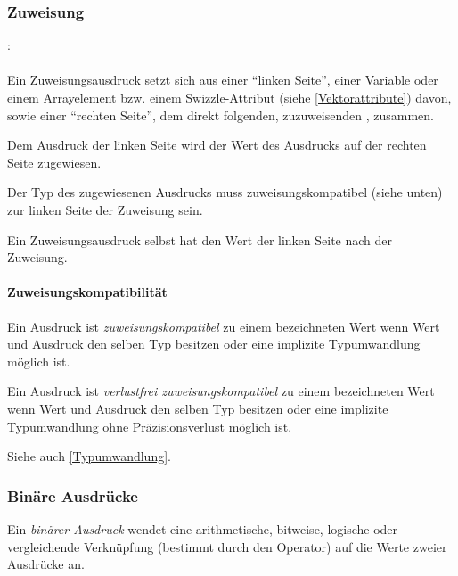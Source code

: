 \subsubsection{Zuweisung}\label{Zuweisung}
:\label{asdr_zuweisung}\\
\hspace*{1cm}\Gspace{}\Gspace\Gt{=}\Gspace{} \\

Ein Zuweisungsausdruck setzt sich aus einer "`linken Seite"', einer Variable oder einem Arrayelement
bzw. einem Swizzle-Attribut (siehe \ref{Vektorattribute}) davon, sowie
einer "`rechten Seite"', dem direkt folgenden, zuzuweisenden , zusammen.

Dem Ausdruck der linken Seite wird der Wert des Ausdrucks
auf der rechten Seite zugewiesen.

Der Typ des zugewiesenen Ausdrucks muss zuweisungskompatibel (siehe unten) zur linken Seite der Zuweisung sein.

Ein Zuweisungsausdruck selbst hat den Wert der linken Seite nach der Zuweisung.

\paragraph{Zuweisungskompatibilität}\label{Zuweisungskompatibilitaet}

Ein Ausdruck ist \emph{zuweisungskompatibel} zu einem bezeichneten Wert wenn
Wert und Ausdruck den selben Typ besitzen oder eine implizite Typumwandlung
möglich ist.

Ein Ausdruck ist \emph{verlustfrei zuweisungskompatibel} zu einem bezeichneten Wert
wenn Wert und Ausdruck den selben Typ besitzen oder eine implizite Typumwandlung
ohne Präzisionsverlust möglich ist.

Siehe auch \ref{Typumwandlung}.


\subsubsection{Binäre Ausdrücke}\label{Binaere Ausdruecke}

Ein \emph{binärer Ausdruck} wendet eine arithmetische, bitweise, logische oder vergleichende Verknüpfung
(bestimmt durch den Operator) auf die Werte zweier Ausdrücke an.

